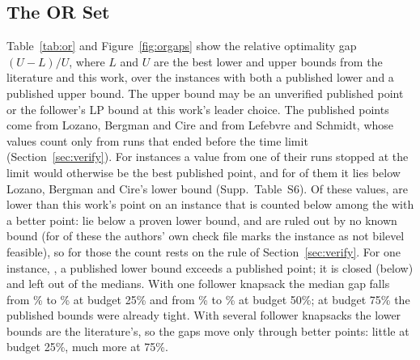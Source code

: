 \documentclass[]{spie}  %
\theoremstyle{plain}
\newcommand{\inst}[1]{\mbox{#1}}             %
\begin{document}
\subsection{The OR Set}\label{sec:res-or}

Table~\ref{tab:or} and Figure~\ref{fig:orgaps} show the relative optimality gap $(U-L)/U$, where
$L$ and $U$ are the best lower and upper bounds from the literature and this work, over the
instances with both a published lower and a published upper bound. The upper bound may be an
unverified published point or the follower's LP bound at this work's leader choice. The published
points come from Lozano, Bergman and Cire\cite{lozano2026network,lozano_dbo_repo} and from Lefebvre
and Schmidt,\cite{lefebvre2025dantzig} whose values count only from runs that ended before the time
limit (Section~\ref{sec:verify}). For \NumOrLsTimeLimitBest{} instances a value from one of their
runs stopped at the limit would otherwise be the best published point, and for
\NumOrLsTimeLimitBelowLb{} of them it lies below Lozano, Bergman and Cire's lower bound (Supp.\
Table~S6). Of these values, \NumOrBetterLsTl{} are lower than this work's point on an instance that
is counted below among the \NumOrBetter{} with a better point: \NumOrBetterLsTlBelowLb{} lie below a
proven lower bound, and \NumOrBetterLsTlOpen{} are ruled out by no known bound (for
\NumOrBetterLsTlKo{} of these the authors' own check file marks the instance as not bilevel
feasible), so for those \NumOrBetterLsTlOpen{} the count rests on the rule of
Section~\ref{sec:verify}. For one instance, \inst{\OrClosureName}, a published lower bound exceeds a published
point; it is closed (below) and left out of the medians. With one follower
knapsack the median gap falls from \OrGapOneQuarterLit\% to \OrGapOneQuarterNow\% at budget 25\%
and from \OrGapOneHalfLit\% to \OrGapOneHalfNow\% at budget 50\%; at budget 75\% the published
bounds were already tight. With several follower knapsacks the lower bounds are the literature's,
so the gaps move only through better points: little at budget 25\%, much more at 75\%.
\end{document}
